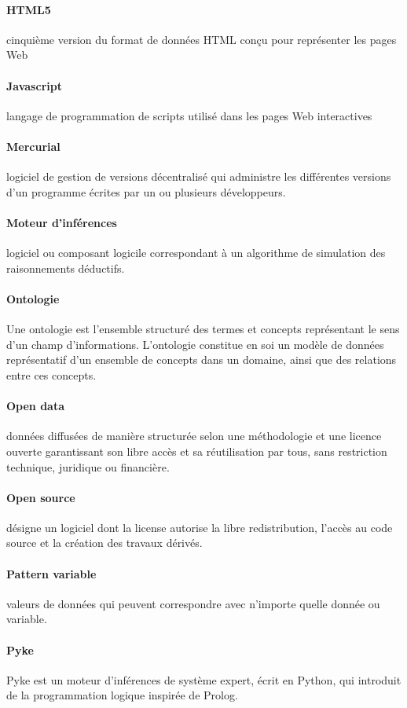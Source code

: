 \documentclass {report}
\begin{document}
\paragraph{HTML5}cinquième version du format de données HTML conçu pour représenter les pages Web
\paragraph{Javascript}langage de programmation de scripts utilisé dans les pages Web interactives
\paragraph{Mercurial}logiciel de gestion de versions décentralisé qui administre les différentes versions d'un programme écrites par un ou plusieurs développeurs.
\paragraph{Moteur d'inférences}logiciel ou composant logicile correspondant à un algorithme de simulation des raisonnements déductifs.
\paragraph{Ontologie}Une ontologie est l'ensemble structuré des termes et concepts représentant le sens d'un champ d'informations. L'ontologie constitue en soi un modèle de données représentatif d'un ensemble de concepts dans un domaine, ainsi que des relations entre ces concepts.
\paragraph{Open data}données diffusées de manière structurée selon une méthodologie et une licence ouverte garantissant son libre accès et sa réutilisation par tous, sans restriction technique, juridique ou financière.
\paragraph{Open source}désigne un logiciel dont la license autorise la libre redistribution, l'accès au code source et la création des travaux dérivés.
\paragraph{Pattern variable}valeurs de données qui peuvent correspondre avec n'importe quelle donnée ou variable.
\paragraph{Pyke}Pyke est un moteur d'inférences de système expert, écrit en Python, qui introduit de la programmation logique inspirée de Prolog.
\end{document}
